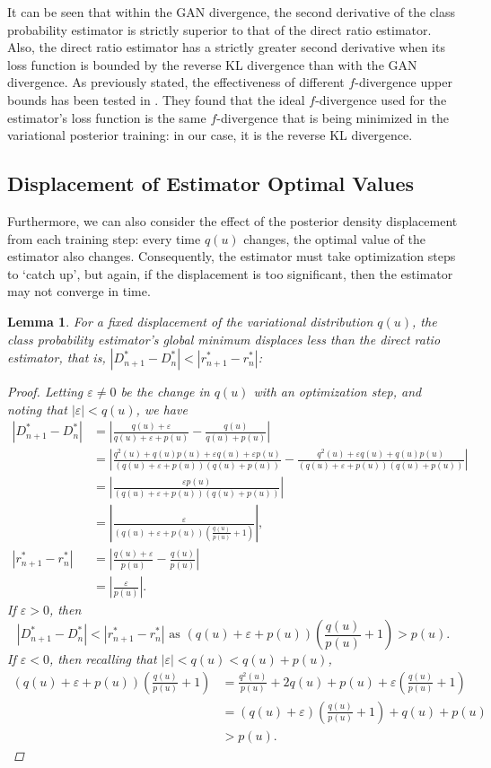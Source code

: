 \documentclass[honours,12pt]{unswthesis}
\newtheorem{lemma}[theorem]{Lemma}
\numberwithin{equation}{section}
\theoremstyle{definition}
\begin{document}
It can be seen that within the GAN divergence, the second derivative of the class probability estimator is strictly superior to that of the direct ratio estimator. Also, the direct ratio estimator has a strictly greater second derivative when its loss function is bounded by the reverse KL divergence than with the GAN divergence.
As previously stated, the effectiveness of different $f$-divergence upper bounds has been tested in \citet{nowozin}. They found that the ideal $f$-divergence used for the estimator's loss function is the same $f$-divergence that is being minimized in the variational posterior training: in our case, it is the reverse KL divergence.
\subsection{Displacement of Estimator Optimal Values}
Furthermore, we can also consider the effect of the posterior density displacement from each training step: every time $q(u)$ changes, the optimal value of the estimator also changes. Consequently, the estimator must take optimization steps to `catch up', but again, if the displacement is too significant, then the estimator may not converge in time.
\begin{lemma}
For a fixed displacement of the variational distribution $q(u)$, the class probability estimator's global minimum displaces less than the direct ratio estimator, that is, $|D^*_{n+1}-D^*_{n}|<|r^*_{n+1}-r^*_{n}|$:
\begin{proof}
Letting $\varepsilon\neq0$ be the change in $q(u)$ with an optimization step, and noting that $|\varepsilon|<q(u)$, we have
\begin{align*}
|D^*_{n+1}-D^*_{n}|&=\left|\frac{q(u)+\varepsilon}{q(u)+\varepsilon+p(u)}-\frac{q(u)}{q(u)+p(u)}\right|\\
&=\left|\frac{q^2(u)+q(u)p(u)+\varepsilon q(u)+\varepsilon p(u)}{(q(u)+\varepsilon+p(u))(q(u)+p(u))}-\frac{q^2(u)+\varepsilon q(u)+q(u)p(u)}{(q(u)+\varepsilon+p(u))(q(u)+p(u))}\right|\\
&=\left|\frac{\varepsilon p(u)}{(q(u)+\varepsilon+p(u))(q(u)+p(u))}\right|\\
&=\left|\frac{\varepsilon}{(q(u)+\varepsilon+p(u))\left(\frac{q(u)}{p(u)}+1\right)}\right|,\\
|r^*_{n+1}-r^*_{n}|&=\left|\frac{q(u)+\varepsilon}{p(u)}-\frac{q(u)}{p(u)}\right|\\
&=\left|\frac{\varepsilon}{p(u)}\right|.
\end{align*}
If $\varepsilon>0$, then
\[|D^*_{n+1}-D^*_{n}|<|r^*_{n+1}-r^*_{n}|\text{ as }(q(u)+\varepsilon+p(u))\left(\frac{q(u)}{p(u)}+1\right)>p(u).\]
If $\varepsilon<0$, then recalling that $|\varepsilon| < q(u) < q(u)+p(u)$,
\begin{align*}
(q(u)+\varepsilon+p(u))(\frac{q(u)}{p(u)}+1)&=\frac{q^2(u)}{p(u)}+2q(u)+p(u)+\varepsilon \left(\frac{q(u)}{p(u)}+1\right)\\
&=(q(u)+\varepsilon)\left(\frac{q(u)}{p(u)}+1\right)+q(u)+p(u)\\
&>p(u).
\end{align*}
\end{proof}
\end{lemma}
\end{document}

